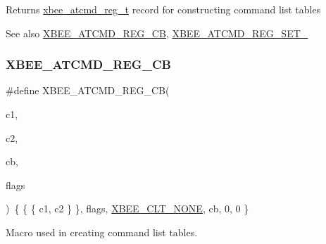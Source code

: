 \begin{DoxyReturn}{Returns}
\hyperlink{structxbee__atcmd__reg__t}{xbee\+\_\+atcmd\+\_\+reg\+\_\+t} record for constructing command list tables
\end{DoxyReturn}
\begin{DoxySeeAlso}{See also}
\hyperlink{group__xbee__atcmd_gabbaf60bd4d186b860fd58c8a6111e9f9}{X\+B\+E\+E\+\_\+\+A\+T\+C\+M\+D\+\_\+\+R\+E\+G\+\_\+\+CB}, \hyperlink{group__xbee__atcmd_ga37dcc1cfc854d7876be99eff279bf2a0}{X\+B\+E\+E\+\_\+\+A\+T\+C\+M\+D\+\_\+\+R\+E\+G\+\_\+\+S\+E\+T\+\_} 
\end{DoxySeeAlso}
\mbox{\label{group__xbee__atcmd_gabbaf60bd4d186b860fd58c8a6111e9f9}} 
\subsubsection{\texorpdfstring{X\+B\+E\+E\+\_\+\+A\+T\+C\+M\+D\+\_\+\+R\+E\+G\+\_\+\+CB}{XBEE\_ATCMD\_REG\_CB}}
{\footnotesize\ttfamily \#define X\+B\+E\+E\+\_\+\+A\+T\+C\+M\+D\+\_\+\+R\+E\+G\+\_\+\+CB(\begin{DoxyParamCaption}\item[{}]{c1,  }\item[{}]{c2,  }\item[{}]{cb,  }\item[{}]{flags }\end{DoxyParamCaption})~\{ \{ \{ c1, c2 \} \}, flags, \hyperlink{group__xbee__atcmd_gga1bd8ecd38c107579d20ded3c79a7d70ba01bd43706bd844415cc0882b861df4d1}{X\+B\+E\+E\+\_\+\+C\+L\+T\+\_\+\+N\+O\+NE}, cb, 0, 0 \}}



Macro used in creating command list tables. 


